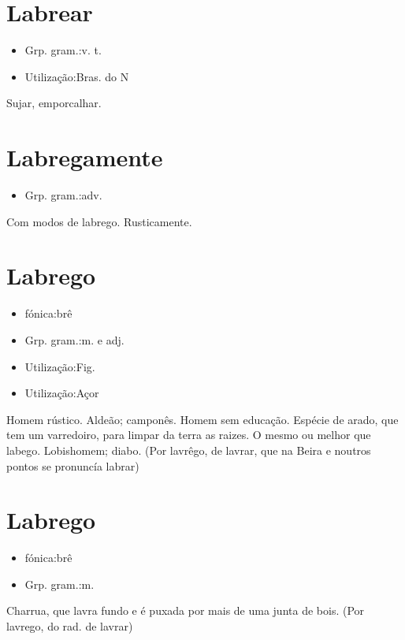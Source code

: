 \section{Labrear}
\begin{itemize}
\item {Grp. gram.:v. t.}
\end{itemize}
\begin{itemize}
\item {Utilização:Bras. do N}
\end{itemize}
Sujar, emporcalhar.
\section{Labregamente}
\begin{itemize}
\item {Grp. gram.:adv.}
\end{itemize}
Com modos de labrego.
Rusticamente.
\section{Labrego}
\begin{itemize}
\item {fónica:brê}
\end{itemize}
\begin{itemize}
\item {Grp. gram.:m.  e  adj.}
\end{itemize}
\begin{itemize}
\item {Utilização:Fig.}
\end{itemize}
\begin{itemize}
\item {Utilização:Açor}
\end{itemize}
Homem rústico.
Aldeão; camponês.
Homem sem educação.
Espécie de arado, que tem um varredoiro, para limpar da terra as raizes.
O mesmo ou melhor que \textunderscore labego\textunderscore .
Lobishomem; diabo.
(Por \textunderscore lavrêgo\textunderscore , de \textunderscore lavrar\textunderscore , que na Beira e noutros pontos se pronuncía \textunderscore labrar\textunderscore )
\section{Labrego}
\begin{itemize}
\item {fónica:brê}
\end{itemize}
\begin{itemize}
\item {Grp. gram.:m.}
\end{itemize}
Charrua, que lavra fundo e é puxada por mais de uma junta de bois.
(Por \textunderscore lavrego\textunderscore , do rad. de \textunderscore lavrar\textunderscore )
